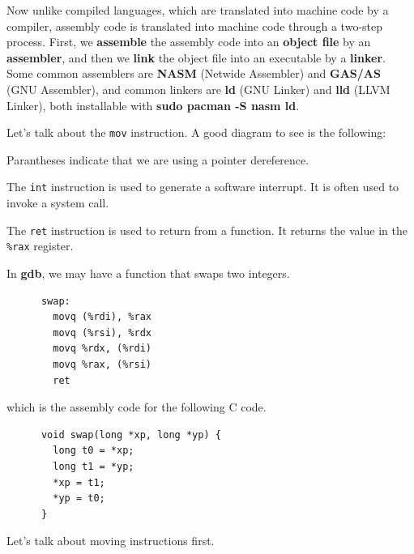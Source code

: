   Now unlike compiled languages, which are translated into machine code by a compiler, assembly code is translated into machine code through a two-step process. First, we \textbf{assemble} the assembly code into an \textbf{object file} by an \textbf{assembler}, and then we \textbf{link} the object file into an executable by a \textbf{linker}. Some common assemblers are \textbf{NASM} (Netwide Assembler) and \textbf{GAS/AS} (GNU Assembler), and common linkers are \textbf{ld} (GNU Linker) and \textbf{lld} (LLVM Linker), both installable with \textbf{sudo pacman -S nasm ld}. 

  \begin{definition}[mov]
    Let's talk about the \texttt{mov} instruction. A good diagram to see is the following: 
    \begin{center}  
    \end{center} 
    Parantheses indicate that we are using a pointer dereference. 
  \end{definition}

  \begin{definition}[int]
    The \texttt{int} instruction is used to generate a software interrupt. It is often used to invoke a system call.
  \end{definition}

  \begin{definition}[ret]
    The \texttt{ret} instruction is used to return from a function. It returns the value in the \texttt{\%rax} register. 
  \end{definition}

  \begin{example}
    In \textbf{gdb}, we may have a function that swaps two integers. 
    \begin{lstlisting} 
      swap:
        movq (%rdi), %rax
        movq (%rsi), %rdx
        movq %rdx, (%rdi)
        movq %rax, (%rsi)
        ret
    \end{lstlisting}
    which is the assembly code for the following C code.
    \begin{lstlisting} 
      void swap(long *xp, long *yp) {
        long t0 = *xp;
        long t1 = *yp;
        *xp = t1;
        *yp = t0;
      }
    \end{lstlisting}
  \end{example}

  Let's talk about moving instructions first. 

